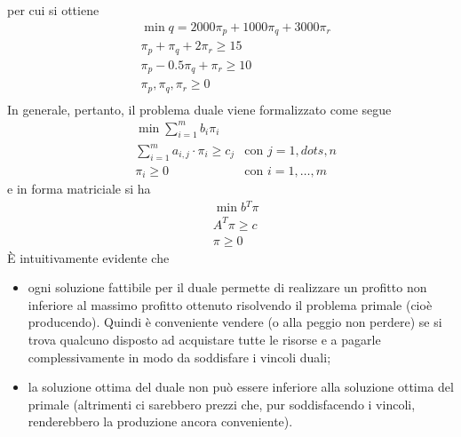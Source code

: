\documentclass[a4paper]{extarticle}
\begin{document}
per cui si ottiene
\begin{align*}
    &\min q = 2000\pi_p+1000\pi_q+3000\pi_r\\
    &\pi_p+\pi_q+2\pi_r \geq 15\\
    &\pi_p-0.5\pi_q+\pi_r \geq 10\\
    &\pi_p,\pi_q,\pi_r \geq 0\\
\end{align*}
In generale, pertanto, il problema duale viene formalizzato come segue
\begin{align*}
    &\min \sum_{i=1}^{m} b_i \pi_i&\\
    &\sum_{i=1}^m a_{i,j} \cdot \pi_i \geq c_j&\text{con } j=1,dots,n\\
    &\pi_i \geq 0&\text{con } i=1,\dots,m
\end{align*}
e in forma matriciale si ha
\begin{align*}
    &\min b{^T} \pi\\
    &A^T \pi \geq c\\
    &\pi \geq 0
\end{align*}
È intuitivamente evidente che
\begin{itemize}
    \item ogni soluzione fattibile per il duale permette di realizzare un profitto non inferiore al massimo profitto ottenuto risolvendo il problema primale (cioè producendo). Quindi è conveniente vendere (o alla peggio non perdere) se si trova qualcuno disposto ad acquistare tutte le risorse e a pagarle complessivamente in modo da soddisfare i vincoli duali;
    \item la soluzione ottima del duale non può essere inferiore alla soluzione ottima del primale (altrimenti ci sarebbero prezzi che, pur soddisfacendo i vincoli, renderebbero la produzione ancora conveniente).
\end{itemize}

\vspace{1em}
\noindent
\end{document}
